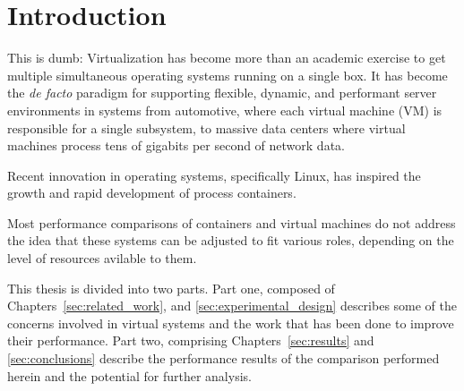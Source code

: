 \chapter{Introduction}
\label{cha:introduction}
\label{sec:introduction}
This is dumb: Virtualization has become more than an academic exercise to get multiple simultaneous operating systems running on a single box.  
It has become the \emph{de facto} paradigm for supporting flexible, dynamic, and performant server environments in systems from automotive, where each virtual machine (VM) is responsible for a single subsystem, to massive data centers where virtual machines process tens of gigabits per second of network data.

Recent innovation in operating systems, specifically Linux, has inspired the growth and rapid development of process containers.

Most performance comparisons of containers and virtual machines do not address the idea that these systems can be adjusted to fit various roles, depending on the level of resources avilable to them.  


This thesis is divided into two parts.
Part one, composed of Chapters~\ref{sec:related_work}, and \ref{sec:experimental_design} describes some of the concerns involved in virtual systems and the work that has been done to improve their performance.
Part two, comprising Chapters~\ref{sec:results} and \ref{sec:conclusions} describe the performance results of the comparison performed herein and the potential for further analysis.
